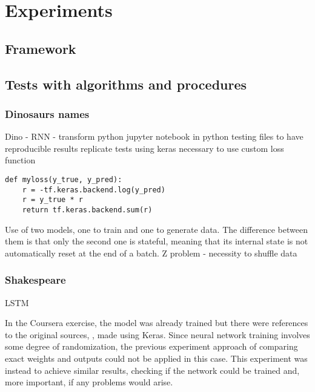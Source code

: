 \chapter{\label{chap:methods}Experiments}

\section{Framework}



\section{Tests with algorithms and procedures}

\subsection{Dinosaurs names}
Dino - RNN - 
transform python jupyter notebook in python testing files to have reproducible results
replicate tests using keras
necessary to use custom loss function
\begin{verbatim}
def myloss(y_true, y_pred):
    r = -tf.keras.backend.log(y_pred)
    r = y_true * r
    return tf.keras.backend.sum(r)
\end{verbatim}
Use of two models, one to train and one to generate data. The difference between them is that only the second one is stateful, meaning that its internal state is not automatically reset at the end of a batch.
Z problem - necessity to shuffle data

\subsection{Shakespeare}
LSTM

In the Coursera exercise, the model was already trained but there were references to the original sources, 
, made using Keras. Since neural network training involves some degree of randomization, the previous experiment approach of comparing exact weights and outputs could not be applied in this case. This experiment was instead to achieve similar results, checking if the network could be trained and, more important, if any problems would arise.

